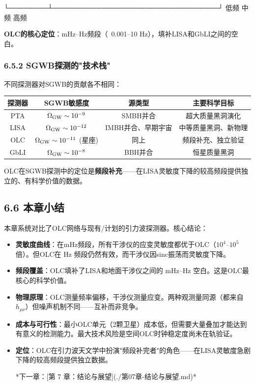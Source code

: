 \documentclass[12pt,a4paper]{article}
\begin{document}
└────────┴──────────────────────────────────┘
低频                  中频              高频

\textbf{OLC的核心定位}：mHz–Hz频段（~0.001–10 Hz），填补LISA和GbLI之间的空白。

\subsubsection{6.5.2 SGWB探测的"技术栈"}


不同探测器对SGWB的贡献各不相同：

\begin{tabular}{|c|c|c|c|}
\hline
探测器 & SGWB敏感度 & 源类型 & 主要科学目标 \\
\hline
PTA & $\Omega_{\rm GW} \sim 10^{-9}$ & SMBH并合 & 超大质量黑洞演化 \\
LISA & $\Omega_{\rm GW} \sim 10^{-12}$ & IMBH并合、早期宇宙 & 中等质量黑洞、新物理 \\
OLC & $\Omega_{\rm GW} \sim 10^{-11}$ (星座) & 同上 & 频段补充、独立验证 \\
GbLI & $\Omega_{\rm GW} \sim 10^{-8}$ & BBH并合 & 恒星质量黑洞 \\
\hline
\end{tabular}


OLC在SGWB探测中的定位是\textbf{频段补充}——在LISA灵敏度下降的较高频段提供独立的、有科学价值的数据。

\subsection{6.6 本章小结}


本章系统对比了OLC网络与现有/计划的引力波探测器。核心结论：

\begin{itemize}
  \item[1] \textbf{灵敏度曲线}：在mHz频段，所有干涉仪的应变灵敏度都优于OLC（$10^4$–$10^5$ 倍）。但OLC在 Hz 频段仍然有效，而干涉仪因sinc振荡而灵敏度下降。

  \item[2] \textbf{频段覆盖}：OLC填补了LISA和地面干涉仪之间的 mHz–Hz 空白。这是OLC最核心的科学价值。

  \item[3] \textbf{物理原理}：OLC测量频率偏移，干涉仪测量应变。两种观测量同源（都来自 $h_{\mu\nu}$）但噪声机制不同——互补而非竞争。

  \item[4] \textbf{成本与可行性}：最小OLC单元（2颗卫星）成本低，但需要大量叠加才能达到有意义的检测能力。最大技术风险是空间OLC时钟稳定度尚未在轨验证。

  \item[5] \textbf{定位}：OLC在引力波天文学中扮演"频段补完者"的角色——在LISA灵敏度急剧下降的较高频段提供独立数据。


*下一章：[第 7 章：结论与展望](./第07章-结论与展望.md)*

\end{itemize}
\end{document}
